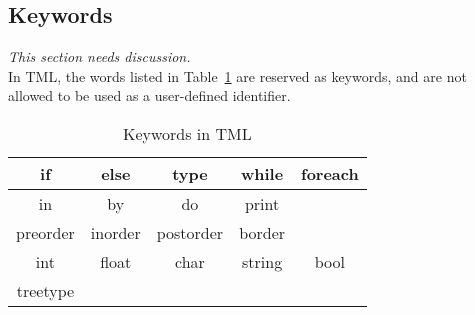 \documentclass[12pt,psfig,a4]{article}
\begin{document}
\subsection{Keywords}
\textit{This section needs discussion.}\\
In TML, the words listed in Table~\ref{keywords} are reserved as keywords, and are not allowed to be used as a user-defined identifier.

\begin{table}[ht]
\begin{center}
\begin{tabular}{| c | c | c | c | c |}
\hline
if & else & type & while & foreach \\
\hline
in & by & do & print &\\
\hline
preorder & inorder & postorder & border &\\
\hline
int & float & char & string & bool  \\
\hline
treetype &  & & & \\
\hline
\end{tabular}
\caption{Keywords in TML}
\label{keywords}
\end {center}
\end{table}

%
\end{document}

